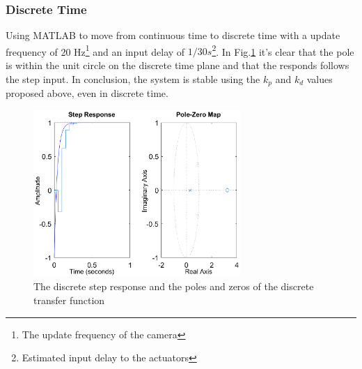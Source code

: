 \subsubsection{Discrete Time}
Using MATLAB to move from continuous time to discrete time with a update frequency of 20 Hz\footnote{The update frequency of the camera} and an input delay of $1/30s$\footnote{Estimated input delay to the actuators}. In Fig.\ref{fig:stepD} it's clear that the pole is within the unit circle on the discrete time plane and that the responds follows the step input. In conclusion, the system is stable using the $k_p$ and $k_d$ values proposed above, even in discrete time.

\begin{figure}[H]
    \centering
    \includegraphics[width= 0.7\textwidth]{img/closed_loop_step_D.eps}
    \caption{The discrete step response and the poles and zeros of the discrete transfer function}
    \label{fig:stepD}
\end{figure}
